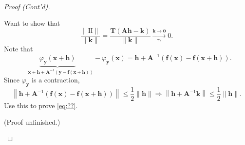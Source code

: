 \documentclass[letterpaper, reqno,11pt]{article}
\begin{document}
\begin{proof}[Proof (Cont'd)]
\begin{enumerate}
    Want to show that
    \begin{equation} \label{eq:??}
      \frac{\lVert \text{II} \rVert}{\lVert \mathbf k \rVert} = \frac{\mathbf T(\mathbf A \mathbf h - \mathbf k)}{\lVert \mathbf k \rVert} \xrightarrow[\text{??}]{\mathbf k \to \mathbf 0} 0.
    \end{equation}
    Note that
    \[ \underbrace{\varphi_{\mathbf y}(\mathbf x + \mathbf h)}_{= \mathbf x + \mathbf h + \mathbf A^{-1}(\mathbf y - \mathbf f(\mathbf x + \mathbf h))} - \varphi_{\mathbf y}(\mathbf x) = \mathbf h + \mathbf A^{-1} (\mathbf f(\mathbf x) - \mathbf f(\mathbf x + \mathbf h)). \]
    Since $\varphi_{\mathbf y}$ is a contraction,
    \[ \left\lVert \mathbf h + \mathbf A^{-1}(\mathbf f(\mathbf x) - \mathbf f(\mathbf x + \mathbf h)) \right\rVert \leq \frac{1}{2} \lVert \mathbf h \rVert \Rightarrow \left\lVert \mathbf h + \mathbf A^{-1} \mathbf k \right\rVert \leq \frac{1}{2} \lVert \mathbf h \rVert. \]
    Use this to prove \eqref{eq:??}.

    (Proof unfinished.)
  \end{enumerate}
\end{proof}
\end{document}
